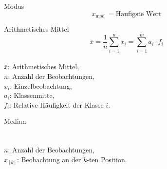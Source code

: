 \begin{definition}{Modus}\\
$$
x_{\text {mod }}=\text{Häufigste Wert}
$$
\end{definition}

\begin{minipage}{0.5\columnwidth}
\begin{concept}{Arithmetisches Mittel}\\
$$
\bar{x}=\frac{1}{n} \sum_{i=1}^{n} x_{i}=\sum_{i=1}^{m} a_{i} \cdot f_{i}
$$
\\
$\bar{x}$: Arithmetisches Mittel, \\
$n$: Anzahl der Beobachtungen, \\
$x_{i}$: Einzelbeobachtung, \\
$a_{i}$: Klassenmitte, \\
$f_{i}$: Relative Häufigkeit der Klasse $i$.
\end{concept}
\end{minipage}%
\begin{minipage}{0.5\columnwidth}
\begin{concept}{Median}\\
\\
\\
$n$: Anzahl der Beobachtungen, \\
$x_{[k]}$: Beobachtung an der $k$-ten Position.
\end{concept}
\end{minipage}

